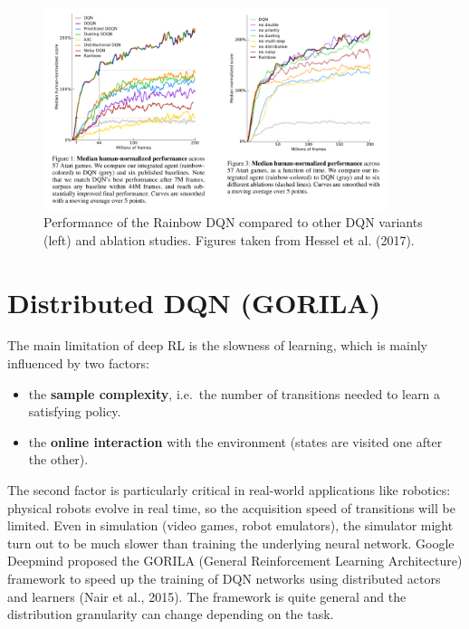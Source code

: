 \documentclass[
  letterpaper,
  DIV=11,
  numbers=noendperiod]{scrreprt}
\providecommand{\tightlist}{%
  \setlength{\itemsep}{0pt}\setlength{\parskip}{0pt}}\usepackage{longtable,booktabs,array}
\begin{document}
\begin{figure}

{\centering \includegraphics[width=0.9\textwidth,height=\textheight]{./img/rainbow.png}

}

\caption{\label{fig-rainbow}Performance of the Rainbow DQN compared to
other DQN variants (left) and ablation studies. Figures taken from
Hessel et al. (2017).}

\end{figure}

\hypertarget{distributed-dqn-gorila}{%
\section{Distributed DQN (GORILA)}\label{distributed-dqn-gorila}}

The main limitation of deep RL is the slowness of learning, which is
mainly influenced by two factors:

\begin{itemize}
\tightlist
\item
  the \textbf{sample complexity}, i.e.~the number of transitions needed
  to learn a satisfying policy.
\item
  the \textbf{online interaction} with the environment (states are
  visited one after the other).
\end{itemize}

The second factor is particularly critical in real-world applications
like robotics: physical robots evolve in real time, so the acquisition
speed of transitions will be limited. Even in simulation (video games,
robot emulators), the simulator might turn out to be much slower than
training the underlying neural network. Google Deepmind proposed the
GORILA (General Reinforcement Learning Architecture) framework to speed
up the training of DQN networks using distributed actors and learners
(Nair et al., 2015). The framework is quite general and the distribution
granularity can change depending on the task.
\end{document}
